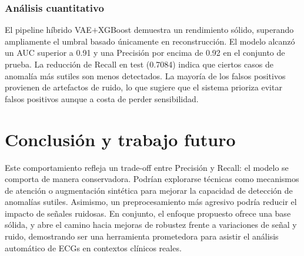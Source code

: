 \documentclass[11pt]{article}
\begin{document}


\subsubsection*{Análisis cuantitativo}
El pipeline híbrido VAE\(+\)XGBoost demuestra un rendimiento sólido, superando ampliamente el umbral basado únicamente en reconstrucción. El modelo alcanzó un AUC superior a 0.91 y una Precisión por encima de 0.92 en el conjunto de prueba. La reducción de Recall en test (0.7084) indica que ciertos casos de anomalía más sutiles son menos detectados. La mayoría de los falsos positivos provienen de artefactos de ruido, lo que sugiere que el sistema prioriza evitar falsos positivos aunque a costa de perder sensibilidad.

\section{Conclusión y trabajo futuro}
Este comportamiento refleja un trade-off entre Precisión y Recall: el modelo se comporta de manera conservadora. Podrían explorarse técnicas como mecanismos de atención o augmentación sintética para mejorar la capacidad de detección de anomalías sutiles. Asimismo, un preprocesamiento más agresivo podría reducir el impacto de señales ruidosas. En conjunto, el enfoque propuesto ofrece una base sólida, y abre el camino hacia mejoras de robustez frente a variaciones de señal y ruido, demostrando ser una herramienta prometedora para asistir el análisis automático de ECGs en contextos clínicos reales.

\end{document}
